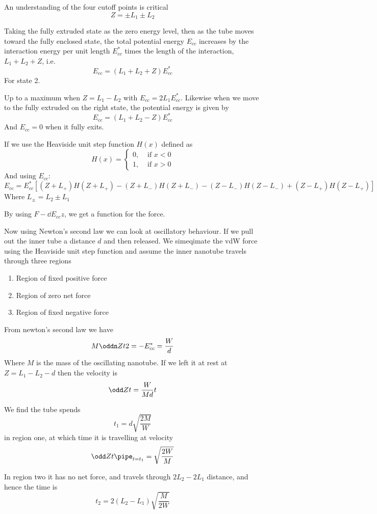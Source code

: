 \documentclass{E:/Documents/Latex/myassignment}
\begin{document}
An understanding of the four cutoff points is critical
\[Z = \pm L_1 \pm L_2\]

Taking the fully extruded state as the zero energy level, then as the tube moves toward the fully enclosed state, the total potential energy $E_{cc}$ increases by the interaction energy per unit length $E_{cc}^*$ times the length of the interaction, $L_1 + L_2 + Z$, i.e.
\[E_{cc} = \left(L_1 + L_2 + Z\right) E_{cc}^*\]
For state 2.

Up to a maximum when $Z = L_1 - L_2$ with $E_{cc} = 2L_1 E_{cc}^*$. Likewise when we move to the fully extruded on the right state, the potential energy is given by
\[E_{cc} = \left(L_1 + L_2 - Z\right) E_{cc}^*\]
And $E_{cc} =0$ when it fully exits.

If we use the Heaviside unit step function $H(x)$ defined as
\[H(x) = \begin{cases}
	0, &\text{ if }x < 0\\
	1, &\text{ if }x > 0
\end{cases}\]
And using $E_{cc}$:
\[E_{cc} = E_{cc}^* \left[(Z + L_+) H(Z+L_+) - (Z+L_-) H(Z + L_-) - (Z-L_-) H(Z-L_-) + (Z-L_+) H(Z-L_+)\right]\]
Where $L_\pm = L_2 \pm L_1$

By using $F - \dd{E_{cc}}z$, we get a function for the force.


Now using Newton's second law we can look at oscillatory behaviour. If we pull out the inner tube a distance $d$ and then released. 
We simeqimate the vdW force using the Heaviside unit step function and assume the inner nanotube travels through three regions
\begin{enumerate}
	\item Region of fixed positive force
	\item Region of zero net force
	\item Region of fixed negative force
\end{enumerate}

From newton's second law we have
\[M \oddn Zt2 = -E_{cc}^* = \frac{W}{d}\]
Where $M$ is the mass of the oscillating nanotube. 
If we left it at rest at $Z = L_1 - L_2 - d$ then the velocity is
\[\odd Zt = \frac{W}{Md}t\]

We find the tube spends
\[t_1 = d\sqrt{\frac{2M}{W}}\]
in region one, at which time it is travelling at velocity
\[\odd Zt \pipe_{t=t_1} = \sqrt{\frac{2W}{M}}\]


In region two it has no net force, and travels through $2L_2 - 2L_1$ distance, and hence the time is
\[t_2 = 2(L_2 - L_1) \sqrt{\frac{M}{2W}}\]
\end{document}
